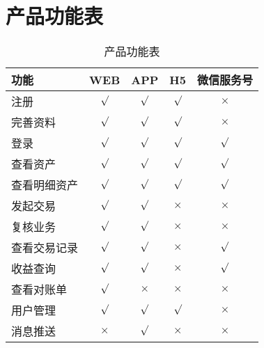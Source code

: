 
\section{产品功能表} %
\label{sec:function_table}
\begin{table}[htbp]
\caption{产品功能表}
\label{tab:function}
\begin{tabular*}{\textwidth}{@{\extracolsep{\fill}}lcccc}
	\toprule  %
	功能                   &WEB            &APP                 &H5               &微信服务号      \\
	\midrule  %
	注册                  &$\surd$         &$\surd$            &$\surd$           &$\times$       \\
	完善资料               &$\surd$         &$\surd$            &$\surd$           &$\times$       \\
	登录                  &$\surd$         &$\surd$            &$\surd$           &$\surd$        \\
	查看资产               &$\surd$         &$\surd$            &$\surd$           &$\surd$        \\
	查看明细资产            &$\surd$         &$\surd$            &$\surd$           &$\surd$        \\
	发起交易               &$\surd$         &$\surd$            &$\times$          &$\times$        \\
	复核业务               &$\surd$         &$\surd$            &$\times$          &$\times$        \\
	查看交易记录            &$\surd$         &$\surd$            &$\times$          &$\surd$        \\
	收益查询               &$\surd$         &$\surd$            &$\times$           &$\surd$        \\
	查看对账单             &$\surd$         &$\times$           &$\times$           &$\times$        \\
	用户管理               &$\surd$         &$\surd$            &$\surd$            &$\times$       \\
	消息推送               &$\times$        &$\surd$            &$\times$           &$\times$       \\
	\bottomrule
\end{tabular*}
\end{table}

